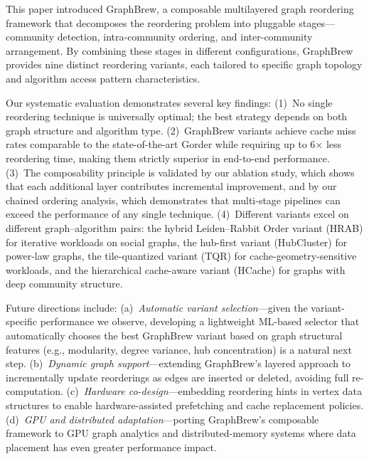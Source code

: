 \documentclass[sigconf, nonacm]{acmart}
\begin{document}
This paper introduced GraphBrew, a composable multilayered graph reordering framework that decomposes the reordering problem into pluggable stages---community detection, intra-community ordering, and inter-community arrangement. By combining these stages in different configurations, GraphBrew provides nine distinct reordering variants, each tailored to specific graph topology and algorithm access pattern characteristics.

Our systematic evaluation demonstrates several key findings: (1)~No single reordering technique is universally optimal; the best strategy depends on both graph structure and algorithm type. (2)~GraphBrew variants achieve cache miss rates comparable to the state-of-the-art Gorder while requiring up to 6$\times$ less reordering time, making them strictly superior in end-to-end performance. (3)~The composability principle is validated by our ablation study, which shows that each additional layer contributes incremental improvement, and by our chained ordering analysis, which demonstrates that multi-stage pipelines can exceed the performance of any single technique. (4)~Different variants excel on different graph--algorithm pairs: the hybrid Leiden--Rabbit Order variant (HRAB) for iterative workloads on social graphs, the hub-first variant (HubCluster) for power-law graphs, the tile-quantized variant (TQR) for cache-geometry-sensitive workloads, and the hierarchical cache-aware variant (HCache) for graphs with deep community structure.

Future directions include: (a)~\emph{Automatic variant selection}---given the variant-specific performance we observe, developing a lightweight ML-based selector that automatically chooses the best GraphBrew variant based on graph structural features (e.g., modularity, degree variance, hub concentration) is a natural next step. (b)~\emph{Dynamic graph support}---extending GraphBrew's layered approach to incrementally update reorderings as edges are inserted or deleted, avoiding full re-computation. (c)~\emph{Hardware co-design}---embedding reordering hints in vertex data structures to enable hardware-assisted prefetching and cache replacement policies. (d)~\emph{GPU and distributed adaptation}---porting GraphBrew's composable framework to GPU graph analytics and distributed-memory systems where data placement has even greater performance impact.


\end{document}
